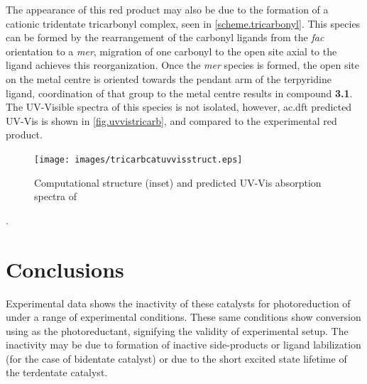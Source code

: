 The appearance of this red product may also be due to the formation of a cationic tridentate tricarbonyl complex, seen in \autoref{scheme.tricarbonyl}. This species can be formed by the rearrangement of the carbonyl ligands from the \textit{fac} orientation to a \textit{mer}, migration of one carbonyl to the open site axial to the ligand achieves this reorganization. Once the \textit{mer} species is formed, the open site on the metal centre is oriented towards the pendant arm of the terpyridine ligand, coordination of that group to the metal centre results in compound \textbf{3.1}. The UV-Visible spectra of this species is not isolated, however, \gls{ac.dft} predicted UV-Vis is shown in \autoref{fig.uvvistricarb}, and compared to the experimental red product. 

\begin{figure}[!htbp]
 \begin{center}
  \texttt{[image: images/tricarbcatuvvisstruct.eps]}
 \end{center}
 \caption[Structure and absorption spectra of proposed ]{Computational structure (inset) and predicted UV-Vis absorption spectra of }
 \label{fig.uvvistricarb}
\end{figure}

.

\section{Conclusions}

Experimental data shows the inactivity of these catalysts for photoreduction of  under a range of experimental conditions. These same conditions show conversion using  as the photoreductant, signifying the validity of experimental setup. The inactivity may be due to formation of inactive side-products or ligand labilization (for the case of bidentate catalyst) or due to the short excited state lifetime of the terdentate catalyst. 
